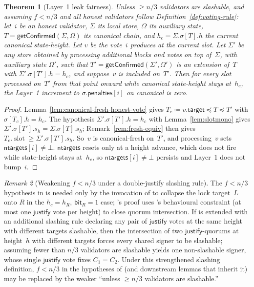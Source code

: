 \documentclass{article}
\newcommand{\slot}[0]{\ensuremath{\operatorname{\mathrm{slot}}}}
\newcommand{\target}{\mathsf{target}}
\newcommand{\just}{\ensuremath{\mathsf{justify}}\xspace}
\newcommand{\ntargets}{\mathsf{ntargets}}
\newcommand{\penalties}{\mathsf{penalties}}
\newcommand{\bit}{\mathsf{bit}}
\newcommand{\getConfirmed}{\textsf{getConfirmed}\xspace}
\theoremstyle{plain}
\newtheorem{theorem}{Theorem}
\theoremstyle{definition}
\theoremstyle{remark}
\newtheorem{remark}[theorem]{Remark}
\begin{document}
\begin{theorem}[Layer~1 leak fairness]\label{thm:fairness}
Unless $\geq n/3$ validators are slashable, and assuming $f < n/3$ and all honest validators follow Definition~\ref{def:voting-rule}: let~$i$ be an honest validator, $\Sigma$ its local store, $\Omega$ its auxiliary state, $T = \getConfirmed(\Sigma, \Omega)$ its canonical chain, and $h_c = \Sigma.\sigma[T].h$ the current canonical state-height.
Let $v$ be the vote~$i$ produces at the current slot.
Let $\Sigma'$ be any store obtained by processing additional blocks and votes on top of~$\Sigma$, with auxiliary state $\Omega'$, such that $T' = \getConfirmed(\Sigma', \Omega')$ is an extension of~$T$ with $\Sigma'.\sigma[T'].h = h_c$, and suppose~$v$ is included on~$T'$.
Then for every slot processed on~$T'$ from that point onward while canonical state-height stays at~$h_c$, the Layer~1 increment to $\sigma.\penalties[i]$ on canonical is zero.
\end{theorem}

\begin{proof}
Lemma~\ref{lem:canonical-fresh-honest-vote} gives $T_c \coloneqq v.\target \preceq T \preceq T'$ with $\sigma[T_c].h = h_c$.
The hypothesis $\Sigma'.\sigma[T'].h = h_c$ with Lemma~\ref{lem:slotmono} gives $\Sigma'.\sigma[T'].s_h = \Sigma.\sigma[T].s_h$; Remark~\ref{rem:fresh-equiv} then gives $T_c.\slot \geq \Sigma'.\sigma[T'].s_h$.
So~$v$ is canonical-fresh on~$T'$, and processing~$v$ sets $\ntargets[i] \neq \bot$.
$\ntargets$ resets only at a height advance, which does not fire while state-height stays at~$h_c$, so $\ntargets[i] \neq \bot$ persists and Layer~1 does not bump~$i$.
\end{proof}

\begin{remark}[Weakening $f < n/3$ under a double-justify slashing rule]\label{rem:canonical-fresh-slashable}
The $f < n/3$ hypothesis in  is needed only by the invocation of  to collapse the lock target~$L$ onto $R$ in the $h_c = h_R$, $\bit_R = 1$ case; 's proof uses 's behavioural constraint (at most one \just vote per height) to close quorum intersection.
If  is extended with an additional slashing rule declaring any pair of \just votes at the same height with different targets slashable, then the intersection of two \just-quorums at height~$h$ with different targets forces every shared signer to be slashable; assuming fewer than $n/3$ validators are slashable yields one non-slashable signer, whose single \just vote fixes $C_1 = C_2$.
Under this strengthened slashing definition, $f < n/3$ in the hypotheses of  (and downstream lemmas that inherit it) may be replaced by the weaker ``unless $\geq n/3$ validators are slashable.''
\end{remark}
\end{document}
